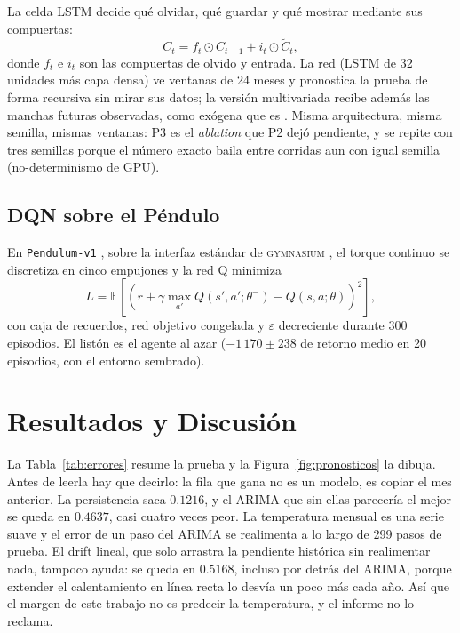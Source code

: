 \documentclass[10pt,journal]{IEEEtran}
\begin{document}
  La celda LSTM \cite{hochreiter1997} decide qu\'e olvidar, qu\'e guardar y qu\'e mostrar mediante sus compuertas:
  \begin{equation}
    C_t = f_t \odot C_{t-1} + i_t \odot \tilde{C}_t,
    \label{eq:lstm}
  \end{equation}
  donde $f_t$ e $i_t$ son las compuertas de olvido y entrada. La red (LSTM de 32 unidades m\'as capa densa) ve ventanas de 24 meses y pronostica la prueba de forma recursiva sin mirar sus datos; la versi\'on multivariada recibe adem\'as las manchas futuras observadas, como ex\'ogena que es \cite{lim2021}. Misma arquitectura, misma semilla, mismas ventanas: P3 es el \emph{ablation} que P2 dej\'o pendiente, y se repite con tres semillas porque el n\'umero exacto baila entre corridas aun con igual semilla (no-determinismo de GPU).

  \subsection{DQN sobre el P\'endulo}

  En \texttt{Pendulum-v1} \cite{gymnasium_pendulum}, sobre la interfaz est\'andar de \textsc{gymnasium} \cite{gymnasium2024}, el torque continuo se discretiza en cinco empujones y la red Q minimiza
  \begin{equation}
    L = \mathbb{E}\left[\left(r + \gamma \max_{a'} Q(s',a';\theta^{-}) - Q(s,a;\theta)\right)^2\right],
    \label{eq:dqn}
  \end{equation}
  con caja de recuerdos, red objetivo congelada y $\varepsilon$ decreciente durante 300 episodios. El list\'on es el agente al azar ($-1\,170\pm238$ de retorno medio en 20 episodios, con el entorno sembrado).

  \section{Resultados y Discusi\'on}

  La Tabla~\ref{tab:errores} resume la prueba y la Figura~\ref{fig:pronosticos} la dibuja. Antes de leerla hay que decirlo: la fila que gana no es un modelo, es copiar el mes anterior. La persistencia saca $0.1216$, y el ARIMA que sin ellas parecer\'ia el mejor se queda en $0.4637$, casi cuatro veces peor. La temperatura mensual es una serie suave y el error de un paso del ARIMA se realimenta a lo largo de 299 pasos de prueba. El drift lineal, que solo arrastra la pendiente histórica sin realimentar nada, tampoco ayuda: se queda en $0.5168$, incluso por detrás del ARIMA, porque extender el calentamiento en línea recta lo desvía un poco más cada año. As\'i que el margen de este trabajo no es predecir la temperatura, y el informe no lo reclama.
\end{document}
